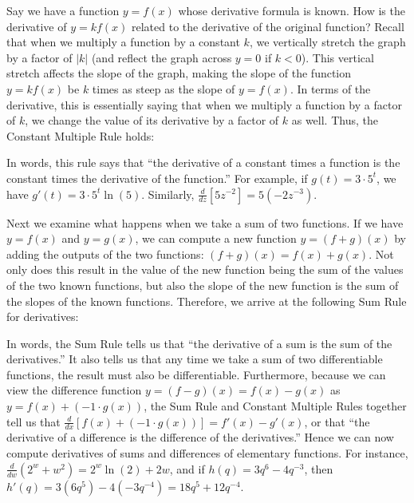 Say we have a function $y = f(x)$ whose derivative formula is known.  How is the derivative of $y = kf(x)$ related to the derivative of the original function?  Recall that when we multiply a function by a constant $k$, we vertically stretch the graph by a factor of $|k|$ (and reflect the graph across $y = 0$ if $k < 0$).  This vertical stretch affects the slope of the graph, making the slope of the function $y = kf(x)$ be $k$ times as steep as the slope of $y = f(x)$.  In terms of the derivative, this is essentially saying that when we multiply a function by a factor of $k$, we change the value of its derivative by a factor of $k$ as well.  Thus, the Constant Multiple Rule holds:



In words, this rule says that ``the derivative of a constant times a function is the constant times the derivative of the function.''  For example, if $g(t) = 3 \cdot 5^t$, we have $g'(t) = 3 \cdot 5^t \ln(5)$.  Similarly, $\frac{d}{dz} [5z^{-2}] = 5 (-2z^{-3})$.

Next we examine what happens when we take a sum of two functions.  If we have $y = f(x)$ and $y = g(x)$, we can compute a new function $y = (f+g)(x)$ by adding the outputs of the two functions:  $(f+g)(x) = f(x) + g(x)$.  Not only does this result in the value of the new function being the sum of the values of the two known functions, but also the slope of the new function is the sum of the slopes of the known functions.  Therefore,  we arrive at the following Sum Rule for derivatives:



In words, the Sum Rule tells us that ``the derivative of a sum is the sum of the derivatives.''  It also tells us that any time we take a sum of two differentiable functions, the result must also be differentiable.  Furthermore, because we can view the difference function $y = (f-g)(x) = f(x) - g(x)$ as $y = f(x) + (-1 \cdot g(x))$, the Sum Rule and Constant Multiple Rules together tell us that $\frac{d}{dx}[f(x) + (-1 \cdot g(x))] = f'(x) - g'(x)$, or that ``the derivative of a difference is the difference of the derivatives.''  Hence we can now compute derivatives of sums and differences of elementary functions.  For instance, $\frac{d}{dw} (2^w + w^2) = 2^w \ln(2) + 2w$, and if $h(q) = 3q^6 - 4q^{-3}$, then $h'(q) = 3 (6q^5) - 4(-3q^{-4}) = 18q^5 + 12q^{-4}$.

